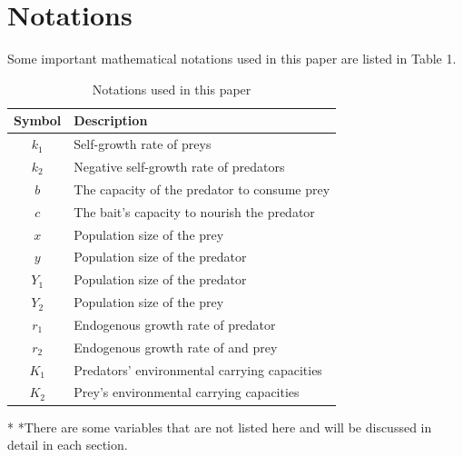 \documentclass[12pt]{article}  %
\begin{document}
\section{Notations}
Some important mathematical notations used in this paper are listed in Table 1. 
\begin{table}[htbp]
	\begin{center}
		\caption{Notations used in this paper}
		\begin{tabular}{c l}
			\toprule[2pt]
			\multicolumn{1}{m{3cm}}{\centering Symbol}
			&\multicolumn{1}{m{8cm}}{\centering Description }\\
			\midrule
			$k_1$& %
			Self-growth rate of preys \\
			$k_2$& %
			Negative self-growth rate of predators \\
			$b$& %
			The capacity of the predator to consume prey\\
			$c$& %
			The bait's capacity to nourish the predator\\
			$x$ & Population size of the prey \\
			$y$ & Population size of the predator \\
			$Y_1$ & Population size of the predator \\
			$Y_2$ & Population size of the prey\\
			$r_1$ & Endogenous growth rate of predator\\
			$r_2$ & Endogenous growth rate of and prey\\
			$K_1$ & Predators' environmental carrying capacities\\
			$K_2$ &Prey's environmental carrying capacities\\
			
			
			\bottomrule[2pt]
		\end{tabular}\label{tb:notation}
		\begin{tablenotes}
			\footnotesize
			\item[*] *There are some variables that are not listed here and will be discussed in detail in each section. %
		\end{tablenotes}
	\end{center}
\end{table}
\vspace{-1cm}%
\end{document}
